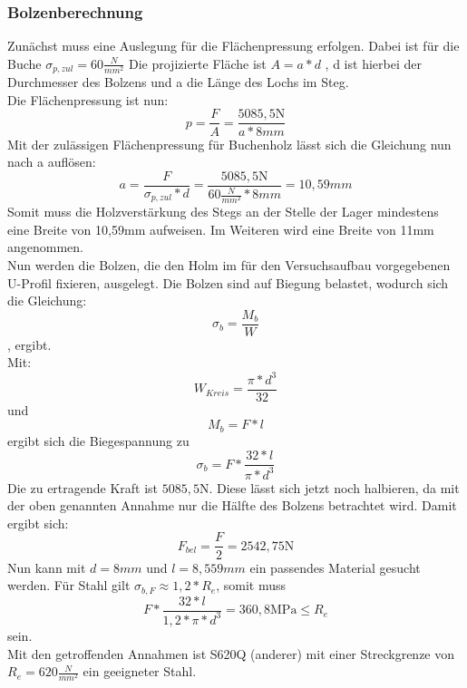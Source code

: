 

\subsubsection{Bolzenberechnung}
Zunächst muss eine Auslegung für die Flächenpressung erfolgen. Dabei ist für die Buche $\sigma_{p,zul}=60\frac{N}{mm^2}$
Die projizierte Fläche ist $A=a*d$ , d ist hierbei der Durchmesser des Bolzens und a die Länge des Lochs im Steg.\\
Die Flächenpressung ist nun: 
\begin{equation}
	p=\frac{F}{A}=\frac{5085,5\mathrm{N}}{a*8mm}
\end{equation}
Mit der zulässigen Flächenpressung für Buchenholz lässt sich die Gleichung nun nach a auflösen:
\begin{equation}
	a=\frac{F}{\sigma_{p,zul}*d}=\frac{5085,5\mathrm{N}}{60\frac{N}{mm^{2}}*8mm}=10,59mm
\end{equation}
Somit muss die Holzverstärkung des Stegs an der Stelle der Lager mindestens eine Breite von 10,59$\mathrm{mm}$ aufweisen. Im Weiteren wird eine Breite von 11$\mathrm{mm}$ angenommen.\\
 
Nun werden die Bolzen, die den Holm im für den Versuchsaufbau vorgegebenen U-Profil fixieren, ausgelegt. Die Bolzen sind auf Biegung belastet, wodurch sich die Gleichung:
\begin{equation}
	\sigma_{b}=\frac{M_{b}}{W} 
\end{equation}
, ergibt.\\
 Mit: 
 \begin{equation}
 	W_{Kreis}=\frac{\pi*d^{3}}{32}
 \end{equation}
 und 
 \begin{equation}
 	M_{b}=F*l
 \end{equation}
 ergibt sich die Biegespannung zu
 \begin{equation}
 	\sigma_{b}=F*\frac{32*l}{\pi*d^{3}}
 \end{equation}
Die zu ertragende Kraft ist $5085,5 \mathrm{N}$. Diese lässt sich jetzt noch halbieren, da mit der oben genannten Annahme nur die Hälfte des Bolzens betrachtet wird. Damit ergibt sich:
 \begin{equation}
 	F_{bel}=\frac{F}{2} =2542,75 \mathrm{N}
 \end{equation}
 Nun kann mit $d=8mm$ und $l=8,559mm$ ein passendes Material gesucht werden. Für Stahl gilt $\sigma_{b,F}\approx1,2*R_{e}$, somit muss 
 \begin{equation}
 	F*\frac{32*l}{1,2*\pi*d^{3}}=360,8\mathrm{MPa}\leq
R_{e} \end{equation}  sein.\\

 Mit den getroffenden Annahmen ist S620Q (anderer) mit einer Streckgrenze von $R_{e}=620\frac{N}{mm^{2}}$ ein geeigneter Stahl. \cite{item6}\\
 
 
 
 
  
 

